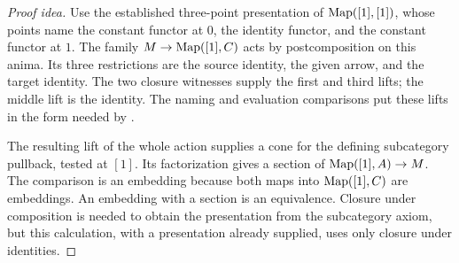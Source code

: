 \documentclass[11pt]{article}
\begin{document}
\begin{proof}[Proof idea]
Use the established three-point presentation of $\operatorname{Map}([1],[1])$,
whose points name the constant functor at $0$, the identity functor,
and the constant functor at $1$.
The family $M\to\operatorname{Map}([1],C)$ acts by postcomposition on this anima.
Its three restrictions are the source identity, the given arrow, and the
target identity. The two closure witnesses supply the first and third
lifts; the middle lift is the identity. The naming and evaluation
comparisons put these lifts in the form needed by
.

The resulting lift of the whole action supplies a cone for the defining
subcategory pullback, tested at $[1]$. Its factorization gives a section
of $\operatorname{Map}([1],A)\to M$. The comparison is an embedding because both maps
into $\operatorname{Map}([1],C)$ are embeddings. An embedding with a section is an
equivalence. Closure under composition is needed to obtain the presentation
from the subcategory axiom, but this calculation, with a presentation
already supplied, uses only closure under identities.
\end{proof}
\end{document}
